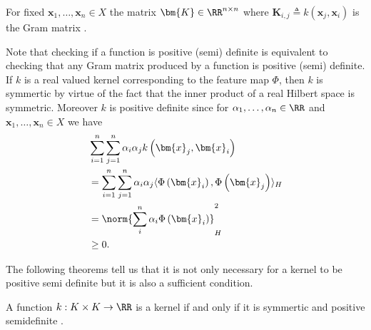 \begin{defe} \label{defe: Gram_Matrix}
    For fixed $\bm{x}_1 ,\ldots , \bm{x}_n \in X$ the matrix $\bm{K} \in \RR^{n \times n}$ where $\bm{K}_{i,j} \triangleq k \left( \bm{x}_j , \bm{x}_i \right)$ is the Gram matrix \cite{SteinwartIngo2008SVMb}.
\end{defe}

Note that checking if a function is positive (semi) definite is equivalent to checking that any Gram matrix produced by a function is positive (semi) definite. If $k$ is a real valued kernel corresponding to the feature map $\Phi$, then $k$ is symmertic by virtue of the fact that the inner product of a real Hilbert space is symmetric. Moreover $k$ is positive definite since for $\alpha_1 , \ldots , \alpha_n \in \RR$ and $\bm{x}_1 ,\ldots , \bm{x}_n \in X$ we have
\begin{align*}
     & \sum_{i=1}^{n} \sum_{j=1}^{n} \alpha_i \alpha_j k \left( \bm{x}_j , \bm{x}_i \right)                                           \\
     & = \sum_{i=1}^{n} \sum_{j=1}^{n} \alpha_i \alpha_j \langle \Phi \left( \bm{x}_i \right), \Phi \left( \bm{x}_j \right) \rangle_H \\
     & = \norm{ \sum_i^n \alpha_i \Phi \left( \bm{x}_i \right) }_{H}^{2}                                                              \\
     & \geq 0.
\end{align*}

The following theorems tell us that it is not only necessary for a kernel to be positive semi definite but it is also a sufficient condition.

\begin{thm} \label{theorem: nec_and_suf_kernel_1}
    A function $k : K \times K \to \RR$ is a kernel if and only if it is symmertic and positive semidefinite \cite{SteinwartIngo2008SVMb}.
\end{thm}